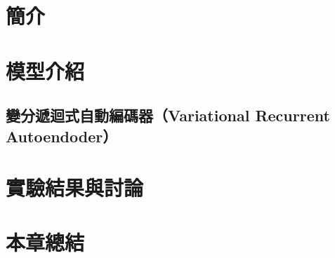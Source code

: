 \section{簡介}

\section{模型介紹}
\subsection{變分遞迴式自動編碼器（Variational Recurrent Autoendoder）}

\section{實驗結果與討論}
\section{本章總結}
